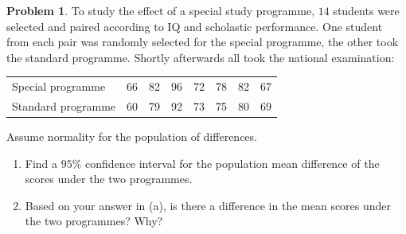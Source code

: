 \documentclass[11pt,a4paper]{article}
\theoremstyle{definition}
\newtheorem{problemx}{Problem}[section]
\newenvironment{problem}{\begin{problemx}}{\end{problemx}}
\begin{document}
\begin{problem}
To study the effect of a special study programme, $14$ students were selected and paired
according to IQ and scholastic performance. One student from each pair was randomly
selected for the special programme, the other took the standard programme. Shortly
afterwards all took the national examination:
\begin{table}[H]
\centering
\begin{tabular}{l|ccccccc}
Special programme & 66 & 82 & 96 & 72 & 78 & 82 & 67\\
Standard programme & 60 & 79 & 92 & 73 & 75 & 80 & 69\\
\end{tabular}
\end{table}
Assume normality for the population of differences.
\begin{enumerate}
\item[(a).] Find a $95\%$ confidence interval for the population mean difference of the
scores under the two programmes.
\item[(b).] Based on your answer in (a), is there a difference in the mean scores under the
two programmes? Why?
\end{enumerate}
\end{problem}
\end{document}
